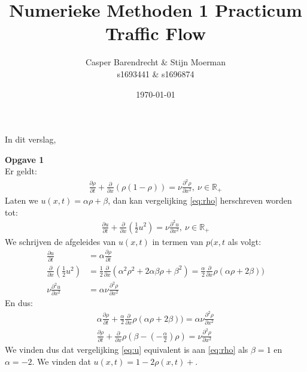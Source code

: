\documentclass{article}
\title{Numerieke Methoden 1 Practicum Traffic Flow}
\author{Casper Barendrecht \& Stijn Moerman\\ s1693441 \& s1696874}
\date{\today}
\begin{document}
\maketitle

In dit verslag, 

\textbf{Opgave 1}\\


Er geldt:
\begin{align}
	\frac{\partial \rho}{\partial t}+\frac{\partial}{\partial x}(\rho(1-\rho))=\nu \frac{\partial^2 \rho}{\partial x^2},~\nu\in \mathbb{R}_+ \label{eq:rho}
	\end{align}
Laten we \(u(x,t)=\alpha\rho + \beta\), dan kan vergelijking \eqref{eq:rho} herschreven worden tot:
	\begin{align}
 \frac{\partial u}{\partial t}+\frac{\partial}{\partial x}\left(\frac{1}{2}u^2\right) = \nu \frac{\partial^2 u}{\partial x^2},~\nu\in \mathbb{R}_+\label{eq:u}
\end{align}
We schrijven de afgeleides van \(u(x,t)\) in termen van \(p(x,t\) als volgt:
\begin{align*}
 \frac{\partial u}{\partial t} &=\alpha\frac{\partial \rho}{\partial t}\\
\frac{\partial}{\partial x}\left(\frac{1}{2}u^2\right)&=\frac{1}{2}\frac{\partial}{\partial x}(\alpha^2\rho^2 +2\alpha\beta\rho+\beta^2)= \frac{\alpha}{2}\frac{\partial}{\partial x}\rho(\alpha\rho+2\beta))\\
\nu \frac{\partial^2 u}{\partial x^2}&=\alpha \nu\frac{\partial^2 \rho}{\partial x^2}
\end{align*}
En dus:
\begin{align*}
	\alpha\frac{\partial \rho}{\partial t}+\frac{\alpha}{2}\frac{\partial}{\partial x}\rho(\alpha\rho+2\beta))=\alpha \nu\frac{\partial^2 \rho}{\partial x^2}\\
		\frac{\partial \rho}{\partial t}+\frac{\partial}{\partial x}\rho(\beta-(-\frac{\alpha}{2})\rho)=\nu\frac{\partial^2 \rho}{\partial x^2}
\end{align*}
We vinden dus dat vergelijking   \eqref{eq:u} equivalent is aan \eqref{eq:rho} als \(\beta=1\) en \(\alpha=-2\). We vinden dat \(u(x,t)=1-2\rho(x,t)+\).\\
\end{document}

